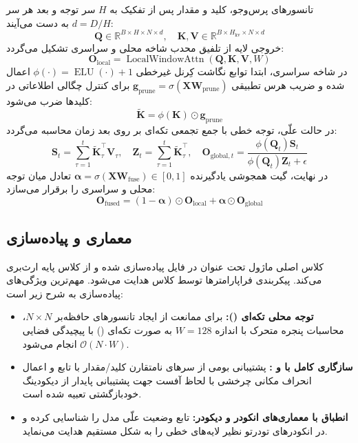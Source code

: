 تانسورهای پرس‌وجو، کلید و مقدار پس از تفکیک به $H$ سر توجه و بعد هر سر $d = D/H$ به دست می‌آیند:
\begin{equation}
\mathbf{Q} \in \mathbb{R}^{B \times H \times N \times d}, \quad \mathbf{K}, \mathbf{V} \in \mathbb{R}^{B \times H_{\text{kv}} \times N \times d}
\end{equation}
خروجی لایه از تلفیق محدب شاخه محلی و سراسری تشکیل می‌گردد:
\begin{equation}
\mathbf{O}_{\text{local}} = \operatorname{LocalWindowAttn}(\mathbf{Q}, \mathbf{K}, \mathbf{V}, W)
\end{equation}
در شاخه سراسری، ابتدا توابع نگاشت کِرنل غیرخطی $\phi(\cdot) = \operatorname{ELU}(\cdot) + 1$ اعمال شده و ضریب هرس تطبیقی $\mathbf{g}_{\text{prune}} = \sigma(\mathbf{X} \mathbf{W}_{\text{prune}})$ برای کنترل چگالی اطلاعاتی در کلیدها ضرب می‌شود:
\begin{equation}
\tilde{\mathbf{K}} = \phi(\mathbf{K}) \odot \mathbf{g}_{\text{prune}}
\end{equation}
در حالت علّی، توجه خطی با جمع تجمعی تکه‌ای بر روی بعد زمان محاسبه می‌گردد:
\begin{equation}
\mathbf{S}_t = \sum_{\tau=1}^t \tilde{\mathbf{K}}_\tau^\top \mathbf{V}_\tau, \quad \mathbf{Z}_t = \sum_{\tau=1}^t \tilde{\mathbf{K}}_\tau^\top, \quad \mathbf{O}_{\text{global}, t} = \frac{\phi(\mathbf{Q}_t) \mathbf{S}_t}{\phi(\mathbf{Q}_t) \mathbf{Z}_t + \epsilon}
\end{equation}
در نهایت، گیت همجوشی یادگیرنده $\boldsymbol{\alpha} = \sigma(\mathbf{X} \mathbf{W}_{\text{fuse}}) \in [0, 1]$ تعادل میان توجه محلی و سراسری را برقرار می‌سازد:
\begin{equation}
\mathbf{O}_{\text{fused}} = (1 - \boldsymbol{\alpha}) \odot \mathbf{O}_{\text{local}} + \boldsymbol{\alpha} \odot \mathbf{O}_{\text{global}}
\end{equation}

\subsection{معماری و پیاده‌سازی}
کلاس اصلی ماژول تحت عنوان  در فایل  پیاده‌سازی شده و از کلاس پایه  ارث‌بری می‌کند. پیکربندی فراپارامترها توسط کلاس  هدایت می‌شود. مهم‌ترین ویژگی‌های پیاده‌سازی به شرح زیر است:
\begin{itemize}
    \item \textbf{توجه محلی تکه‌ای ():} برای ممانعت از ایجاد تانسورهای حافظه‌بر $N \times N$، محاسبات پنجره متحرک با اندازه $W=128$ به صورت تکه‌ای () با پیچیدگی فضایی $\mathcal{O}(N \cdot W)$ انجام می‌شود.
    \item \textbf{سازگاری کامل با  و :} پشتیبانی بومی از سرهای نامتقارن کلید/مقدار با تابع  و اعمال انحراف مکانی چرخشی با لحاظ آفست  جهت پشتیبانی پایدار از دیکودینگ خودبازگشتی تعبیه شده است.
    \item \textbf{انطباق با معماری‌های انکودر و دیکودر:} تابع  وضعیت علّی مدل را شناسایی کرده و در انکودرهای تودرتو نظیر  لایه‌های خطی را به شکل مستقیم هدایت می‌نماید.
\end{itemize}

